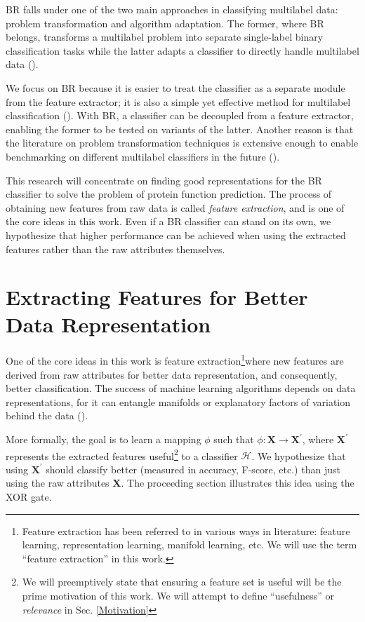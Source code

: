 \par BR falls under one of the two main approaches in classifying multilabel data:
problem transformation and algorithm adaptation. The former, where BR
belongs, transforms a multilabel problem into separate single-label binary
classification tasks while the latter adapts a classifier to directly handle
multilabel data (\cite{tsoumakas2007multilabel}).

\par We focus on BR because it is easier to treat the classifier as a separate
module from the feature extractor; it is also a simple yet effective method
for multilabel classification (\cite{luaces2012binary}). With BR, a
classifier can be decoupled from a feature extractor, enabling the former to
be tested on variants of the latter. Another reason is that the literature on
problem transformation techniques is extensive enough to enable benchmarking
on different multilabel classifiers in the future (\cite{zhang2014review,
madjarov2012extensive}).

\par This research will concentrate on finding good representations for the BR
classifier to solve the problem of protein function prediction. The process of
obtaining new features from raw data is called \textit{feature extraction}, and
is one of the core ideas in this work. Even if a BR classifier can stand on its
own, we hypothesize that higher performance can be achieved when using the
extracted features rather than the raw attributes themselves.

\section{Extracting Features for Better Data Representation}
\label{FeatureExtraction}

\par One of the core ideas in this work is feature extraction\footnote{
  Feature extraction has been referred to in various ways in literature:
  feature learning, representation learning, manifold learning, etc. We will
  use the term ``feature extraction'' in this work.
}\textemdash where new features are derived from raw attributes for better
data representation, and consequently, better classification. The success of
machine learning algorithms depends on data representations, for it can
entangle manifolds or explanatory factors of variation behind the data
(\cite{bengio2013representation}). 

\par More formally, the goal is to learn a mapping $\phi$ such that $\phi:
\mathbf{X} \rightarrow \mathbf{X}^{\prime}$, where $\mathbf{X}^{\prime}$
represents the extracted features useful\footnote{
  We will preemptively state that ensuring a feature set is useful will
  be the prime motivation of this work. We will attempt to define ``usefulness''
  or \textit{relevance} in Sec. \ref{Motivation}
} to a classifier $\mathcal{H}$. We
hypothesize that using $\mathbf{X}^{\prime}$ should classify better (measured
in accuracy, F-score, etc.) than just using the raw attributes $\mathbf{X}$.
The proceeding section illustrates this idea using the XOR gate.


